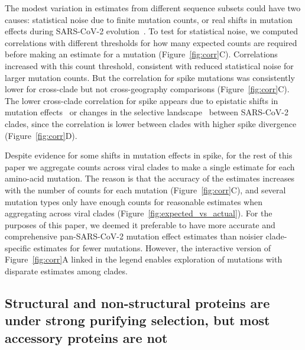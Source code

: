 \documentclass[9pt,twocolumn,twoside]{gsajnl_modified}
\begin{document}
The modest variation in estimates from different sequence subsets could have two causes: statistical noise due to finite mutation counts, or real shifts in mutation effects during SARS-CoV-2 evolution~\citep{starr2022shifting,moulana2022compensatory}.
To test for statistical noise, we computed correlations with different thresholds for how many expected counts are required before making an estimate for a mutation (Figure~\ref{fig:corr}C).
Correlations increased with this count threshold, consistent with reduced statistical noise for larger mutation counts.
But the correlation for spike mutations was consistently lower for cross-clade but not cross-geography comparisons (Figure~\ref{fig:corr}C).
The lower cross-clade correlation for spike appears due to epistatic shifts in mutation effects~\citep{starr2022shifting, moulana2022compensatory, pollock2012amino, shah2015contingency} or changes in the selective landscape~\citep{sun2023rapidly} between SARS-CoV-2 clades, since the correlation is lower between clades with higher spike divergence (Figure~\ref{fig:corr}D).

Despite evidence for some shifts in mutation effects in spike, for the rest of this paper we aggregate counts across viral clades to make a single estimate for each amino-acid mutation.
The reason is that the accuracy of the estimates increases with the number of counts for each mutation (Figure~\ref{fig:corr}C), and several mutation types only have enough counts for reasonable estimates when aggregating across viral clades (Figure~\ref{fig:expected_vs_actual}).
For the purposes of this paper, we deemed it preferable to have more accurate and comprehensive pan-SARS-CoV-2 mutation effect estimates than noisier clade-specific estimates for fewer mutations.
However, the interactive version of Figure~\ref{fig:corr}A linked in the legend enables exploration of mutations with disparate estimates among clades.

\subsection*{Structural and non-structural proteins are under strong purifying selection, but most accessory proteins are not}
\end{document}
